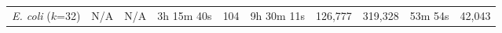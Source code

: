 \begin{table}
\begin{tabular}{@{}crrrrrrrrr@{}}


    
    \emph{E. coli} ($k$=32)         & N/A & N/A & 3h 15m 40s & 104 & 9h 30m 11s & 126,777 & 319,328 &  53m 54s & 42,043 \\




\end{tabular}
\end{table}
